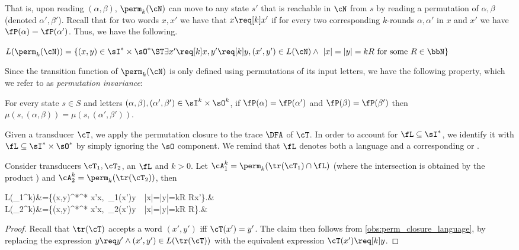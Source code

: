 That is, upon reading $(\alpha,\beta)$, $\perm_k(\cN)$ can move to any state $s'$ that is reachable in $\cN$ from $s$
by reading a permutation of $\alpha,\beta$ (denoted $\alpha',\beta'$).
Recall that for two words $x,x'$ we have that $x\req[k]x'$ if for every two corresponding $k$-rounds $\alpha,\alpha'$ in $x$ and $x'$ we have $\fP(\alpha)=\fP(\alpha')$. 
Thus, we have the following.
\begin{observation}
	\label{obs:perm_closure_language}
	$L(\perm_k(\cN))=\{(x,y)\in \sI^*\times \sO^* \ST \exists x'\req[k] x, y'\req[k] y, (x',y')\in L(\cN) \wedge\ |x|=|y|=kR \text{ for some }R\in \bbN\}$
	\end{observation}
Since the transition function of $\perm_k(\cN)$ is only defined using permutations of its input letters, we have the following property, which we refer to as \emph{permutation invariance}:
\begin{observation}
	\label{obs:perm_invariance}
	For every state $s\in S$ and letters $(\alpha,\beta), (\alpha',\beta')\in \sI^k \times \sO^k$, if $\fP(\alpha)=\fP(\alpha')$ and $\fP(\beta)=\fP(\beta')$ then $\mu(s,(\alpha,\beta))=\mu(s,(\alpha',\beta'))$.
\end{observation}

Given a transducer $\cT$, we apply the permutation closure to the trace $\DFA$ of $\cT$. In order to account for $\fL\subseteq \sI^*$, we identify it with $\fL\subseteq \sI^*\times \sO^*$ by simply ignoring the $\sO$ component. We remind that $\fL$ denotes both a language and a corresponding \DFA or \NFA.
\begin{lemma}
	\label{lem:permutation_closure_construction}
	Consider transducers $\cT_1,\cT_2$, an \NFA $\fL$ and $k>0$. Let $\cA_1^k=\perm_k(\tr(\cT_1)\cap \fL)$ (where the intersection is obtained by the product \NFA) and $\cA_2^k=\perm_k(\tr(\cT_2))$, then
	\begin{flalign*}
	L(\cA_1^k)&=\{(x,y)\in \sI^*\times \sO^* \ST \exists x'\req[k] x,\ \cT_1(x')\req[k] y\ \wedge\ |x|=|y|=kR R\in \bbN \wedge x'\in \fL\}.&\\
	L(\cA_2^k)&=\{(x,y)\in \sI^*\times \sO^* \ST \exists x'\req[k] x,\ \cT_2(x')\req[k] y\ \wedge\ |x|=|y|=kR R\in \bbN\}.&
	\end{flalign*}
\end{lemma}
\begin{proof}
	Recall that $\tr(\cT)$ accepts a word $(x',y')$ iff $\cT(x')=y'$. The claim then follows from \cref{obs:perm_closure_language}, by replacing the expression $y\req y' \wedge (x',y')\in L(\tr(\cT))$ with the equivalent expression $\cT(x')\req[k] y$.
\end{proof}

